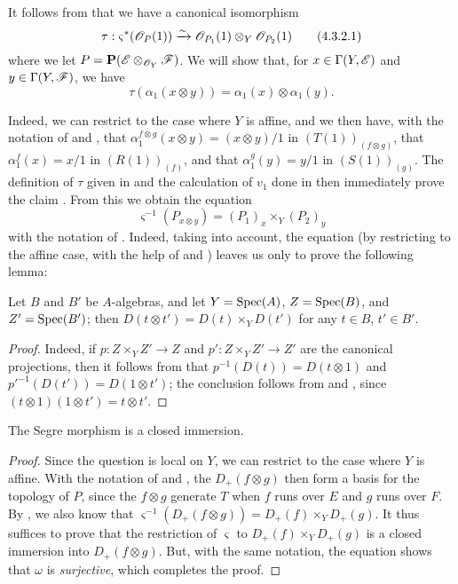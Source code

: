 \begin{env}[4.3.2]
\label{II.4.3.2}
It follows from  that we have a canonical isomorphism
\[
\label{II.4.3.2.1}
  \tau: \varsigma^*(\mathscr{O}_P(1)) \xrightarrow{\sim} \mathscr{O}_{P_1}(1)\otimes_Y\mathscr{O}_{P_2}(1)
  \tag{4.3.2.1}
\]
where we let $P=\mathbf{P}(\mathscr{E}\otimes_{\mathscr{O}_Y}\mathscr{F})$.
We will show that, for $x\in\Gamma(Y,\mathscr{E})$ and $y\in\Gamma(Y,\mathscr{F})$, we have
\[
\label{II.4.3.2.2}
  \tau(\alpha_1(x\otimes y)) = \alpha_1(x)\otimes\alpha_1(y).
  \tag{4.3.2.2}
\]

Indeed, we can restrict to the case where $Y$ is affine, and we then have, with the notation of  and , that $\alpha_1^{f\otimes g}(x\otimes y)=(x\otimes y)/1$ in $(T(1))_{(f\otimes g)}$, that $\alpha_1^f(x)=x/1$ in $(R(1))_{(f)}$, and that $\alpha_1^g(y)=y/1$ in $(S(1))_{(g)}$.
The definition of $\tau$ given in  and the calculation of $v_1$ done in  then immediately prove the claim .
From this we obtain the equation
\[
\label{II.4.3.2.3}
  \varsigma^{-1}(P_{x\otimes y}) = (P_1)_x\times_Y(P_2)_y
  \tag{4.3.2.3}
\]
with the notation of .
Indeed, taking  into account, the equation  (by restricting to the affine case, with the help of  and ) leaves us only to prove the following lemma:
\begin{lemma}[4.3.2.4]
\label{II.4.3.2.4}
Let $B$ and $B'$ be $A$-algebras, and let $Y=\operatorname{Spec}(A)$, $Z=\operatorname{Spec}(B)$, and $Z'=\operatorname{Spec}(B')$;
then $D(t\otimes t')=D(t)\times_Y D(t')$ for any $t\in B$, $t'\in B'$.
\end{lemma}
\begin{proof}
Indeed, if $p:Z\times_Y Z'\to Z$ and $p':Z\times_Y Z'\to Z'$ are the canonical projections, then it follows from  that $p^{-1}(D(t))=D(t\otimes1)$ and $p'^{-1}(D(t'))=D(1\otimes t')$;
the conclusion follows from  and , since $(t\otimes1)(1\otimes t')=t\otimes t'$.
\end{proof}
\end{env}

\begin{proposition}[4.3.3]
\label{II.4.3.3}
The Segre morphism is a closed immersion.
\end{proposition}

\begin{proof}
Since the question is local on $Y$, we can restrict to the case where $Y$ is affine.
With the notation of  and , the $D_+(f\otimes g)$ then form a basis for the topology of $P$, since the $f\otimes g$ generate $T$ when $f$ runs over $E$ and $g$ runs over $F$.
By , we also know that $\varsigma^{-1}(D_+(f\otimes g))=D_+(f)\times_Y D_+(g)$.
It thus suffices  to prove that the restriction of $\varsigma$ to $D_+(f)\times_Y D_+(g)$ is a closed immersion into $D_+(f\otimes g)$.
But, with the same notation, the equation  shows that $\omega$ is \emph{surjective}, which completes the proof.
\end{proof}

